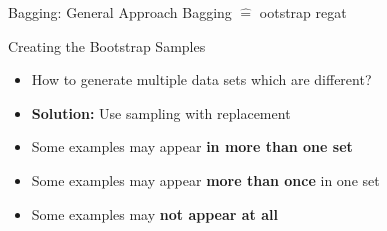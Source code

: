 \begin{frame}{Bagging: General Approach}{}
	Bagging $\widehat{=}$ ootstrap regat
	\vspace*{-2mm}
	
\end{frame}


\begin{frame}{Creating the Bootstrap Samples}{}
	\begin{itemize}
		\item How to generate multiple data sets which are different?
		\item \textbf{Solution:} Use sampling with replacement
		\vspace*{2mm}
		
		\vspace*{2mm}
		\item Some examples may appear \textbf{in more than one set}
		\item Some examples may appear \textbf{more than once} in one set
		\item Some examples may \textbf{not appear at all}
	\end{itemize}
\end{frame}


\begin{frame}[plain]{}{}
	\begin{algorithm}[H]
		\DontPrintSemicolon
		\footnotesize
		\;
		\;
 		\caption{Bagging Algorithm}
	\end{algorithm}
\end{frame}


